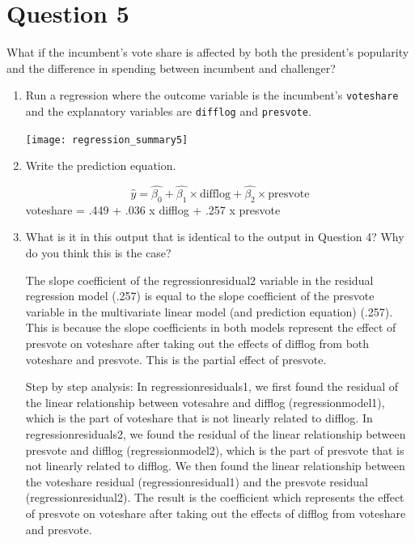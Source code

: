 \documentclass[12pt,letterpaper]{article}
\begin{document}
\section*{Question 5}
\noindent What if the incumbent's vote share is affected by both the president's popularity and the difference in spending between incumbent and challenger? 
	\begin{enumerate}
		\item Run a regression where the outcome variable is the incumbent's \texttt{voteshare} and the explanatory variables are \texttt{difflog} and \texttt{presvote}.	\vspace{.25cm}
		
		
		
		\texttt{[image: regression\_summary5]}
		
		\item Write the prediction equation.	\vspace{.25cm}
		
			$$\hat{y}= \hat{\beta_0} + \hat{\beta_1} \times \text{difflog}+ \hat{\beta_2} \times \text{presvote}$$
		voteshare = .449 + .036 x difflog + .257 x presvote
		
	
		\item What is it in this output that is identical to the output in Question 4? Why do you think this is the case?
		
	The slope coefficient of the regressionresidual2 variable in the residual regression model (.257) is equal to the slope coefficient of the presvote variable in the multivariate linear model (and prediction equation) (.257). This is because the slope coefficients in both models represent the effect of presvote on voteshare after taking out the effects of difflog from both voteshare and presvote. This is the partial effect of presvote. 
		
	Step by step analysis: 
	In regressionresiduals1, we first found the residual of the linear relationship between votesahre and difflog (regressionmodel1), which is the part of voteshare that is not linearly related to difflog. In regressionresiduals2, we found the residual of the linear relationship between presvote and difflog (regressionmodel2), which is the part of presvote that is not linearly related to difflog.  We then found the linear relationship between the voteshare residual (regressionresidual1) and the presvote residual (regressionresidual2). The result is the coefficient which represents the effect of presvote on voteshare after taking out the effects of difflog from voteshare and presvote.
		
	\end{enumerate}
\end{document}
